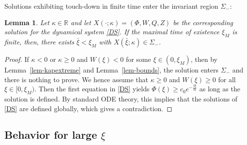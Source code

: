 \documentclass{article}%
\newtheorem{lemma}[theorem]{Lemma}
\newcommand{\kap}{\kappa}
\newcommand{\R}{\mathbb{R}}
\begin{document}
Solutions exhibiting touch-down in finite time enter the invariant region $\Sigma_-$:
\begin{lemma}\label{lem-globalsol}
Let $\kappa\in \R$ and let $X(\cdot;\kappa) = (\Phi,W,Q,Z)$ be the corresponding solution 
for the dynamical system \eqref{DS}. If the maximal time of existence $\xi_M$ is finite, 
then, there exists $\bar \xi < \xi_M$ with $X(\bar \xi;\kappa) \in \Sigma_-$.
\end{lemma}
\begin{proof}
If $\kap < 0$ or $\kap \geq 0$ and $W(\xi) < 0$ for some $\xi \in (0,\xi_M)$, 
then by Lemma~\ref{lem-kapextreme} and Lemma~\ref{lem-bounds}, the solution enters 
$\Sigma_-$ and there is nothing to prove. We hence assume that $\kappa \geq 0$ and 
$W(\xi) \geq 0$ for all $\xi\in [ 0,\xi_{M})$. Then the first equation in \eqref{DS} 
yields $\Phi(\xi) \geq c_{0}e^{-\frac{4\xi}{m}}$ as long as the solution is defined. 
By standard ODE theory, this implies that the solutions of \eqref{DS} are defined globally,
 which gives a contradiction.
\end{proof}

\subsection{Behavior for large $\xi$}
\end{document}
